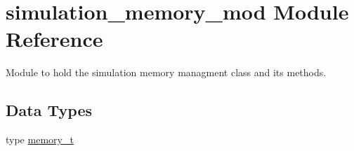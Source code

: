 \hypertarget{namespacesimulation__memory__mod}{}\section{simulation\+\_\+memory\+\_\+mod Module Reference}
\label{namespacesimulation__memory__mod}


Module to hold the simulation memory managment class and its methods.  


\subsection*{Data Types}
\begin{DoxyCompactItemize}
\item 
type \hyperlink{structsimulation__memory__mod_1_1memory__t}{memory\+\_\+t}
\end{DoxyCompactItemize}
